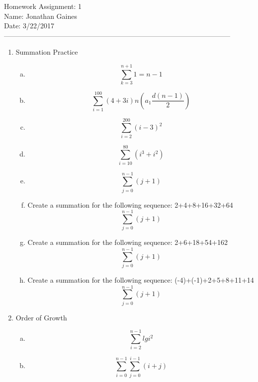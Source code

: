 \documentclass[12pt]{article}
\begin{document}
Homework Assignment: 1\\ 
Name: Jonathan Gaines\\ 
Date: 3/22/2017\\ --------------------------------------------------------------------------------------------------
\begin {enumerate}
\item Summation Practice
				\begin {enumerate}[(a)]
					\item $$\sum_{k=3}^{n+1} 1 = n-1 $$
					\item $$\sum_{i=1}^{100} (4+3i)
									n(a_1 \frac{d(n-1)}{2})  $$
					\item $$\sum_{i=2}^{200} (i-3)^{2}$$   		
					\item $$\sum_{i=10}^{80} (i^{3} + i^{2})$$
					\item $$\sum_{j=0}^{n-1} (j+1)$$					
					\item Create a summation for the following sequence: 2+4+8+16+32+64
								$$\sum_{j=0}^{n-1} (j+1)$$	
					\item Create a summation for the following sequence: 2+6+18+54+162 
								$$\sum_{j=0}^{n-1} (j+1)$$		
				\item Create a summation for the following sequence: (-4)+(-1)+2+5+8+11+14
								$$\sum_{j=0}^{n-1} (j+1)$$	
				\end {enumerate}
\item Order of Growth
				\begin {enumerate}[(a)]
					\item $$\sum_{i=2}^{n-1} lgi^{2}$$ 
					\item $$\sum_{i=0}^{n-1} \sum_{j=0}^{i-1} (i+j) $$
				\end {enumerate}
\end {enumerate}
\end{document}
